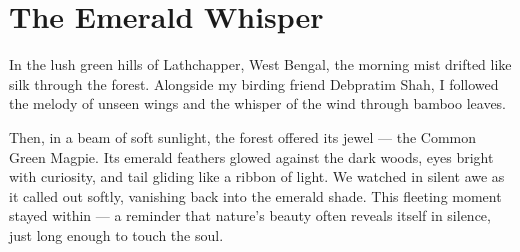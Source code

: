 \documentclass[12pt]{article}
\begin{document}
\newpage

\section*{The Emerald Whisper}
\label{bird:4}
\vspace{0.5em}
\noindent
\begin{minipage}[t][11.5cm][t]{11.5cm}\justifying \noindent In the lush green hills of Lathchapper, West Bengal, the morning mist drifted like silk through the forest. Alongside my birding friend Debpratim Shah, I followed the melody of unseen wings and the whisper of the wind through bamboo leaves.\end{minipage}\hspace{0.8cm}\begin{minipage}[t][11.5cm][c]{12.0cm}\centering {}\end{minipage}
\newpage
\vspace*{0.3cm}
\noindent Then, in a beam of soft sunlight, the forest offered its jewel — the Common Green Magpie. Its emerald feathers glowed against the dark woods, eyes bright with curiosity, and tail gliding like a ribbon of light.
We watched in silent awe as it called out softly, vanishing back into the emerald shade. This fleeting moment stayed within — a reminder that nature's beauty often reveals itself in silence, just long enough to touch the soul.

\newpage
\end{document}

